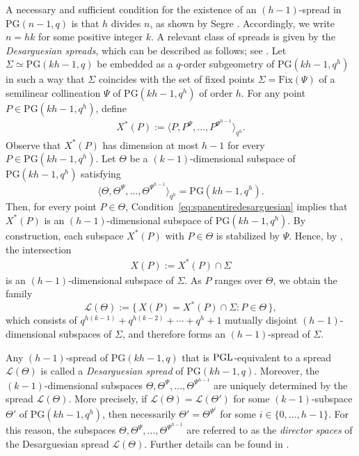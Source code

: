 \documentclass[11pt]{article}
\theoremstyle{definition}
\numberwithin{equation}{section}
\def\cL{\mathcal L}
\def\PG{\mathrm{PG}}
\def\PGL{{\rm PGL}}
\newcommand{\Fix}{\mathrm{Fix}}
\begin{document}
A necessary and sufficient condition for the existence of an $(h-1)$-spread
in $\PG(n-1,q)$ is that $h$ divides $n$, as shown by Segre \cite{segre1964teoria}.
Accordingly, we write $n=hk$ for some positive integer $k$.
A relevant class of spreads is given by the \emph{Desarguesian spreads},  which can
be described as follows; see \cite{segre1964teoria}. Let $\Sigma \simeq \PG(kh-1,q)$ be embedded as a $q$-order subgeometry of
$\PG(kh-1,q^h)$ in such a way that $\Sigma$ coincides with
the set of fixed points
$
\Sigma = \Fix(\Psi)
$
of a semilinear collineation $\Psi$ of $\PG(kh-1, q^h)$ of order $h$.
For any point $P \in \PG(kh-1, q^h)$, define
\begin{align*}
X^*(P) := \langle P, P^{\Psi}, \ldots, P^{\Psi^{h-1}} \rangle_{q^h}.    
\end{align*}
Observe that $X^*(P)$ has dimension at most $h-1$ for every $P \in \PG(kh-1, q^h)$. Let $\Theta$ be a $(k-1)$-dimensional subspace of $\PG(kh-1, q^h)$ satisfying
\begin{equation}\label{eq:spanentiredesarguesian}
\langle \Theta, \Theta^{\Psi}, \ldots, \Theta^{\Psi^{h-1}} \rangle_{q^h}
= \PG(kh-1, q^h).
\end{equation}
Then, for every point $P \in \Theta$, Condition~\eqref{eq:spanentiredesarguesian}
implies that $X^*(P)$ is an $(h-1)$-dimensional subspace of $\PG(kh-1, q^h)$. By construction, each subspace $X^*(P)$ with $P \in \Theta$ is stabilized by
$\Psi$. Hence, by \cite[Lemma~1]{lunardon1999normal}, the intersection
\begin{align*}
X(P) := X^*(P) \cap \Sigma  
\end{align*}
is an $(h-1)$-dimensional subspace of $\Sigma$.
As $P$ ranges over $\Theta$, we obtain the family
\[
\cL(\Theta)
:= \{\, X(P) = X^*(P) \cap \Sigma : P \in \Theta \,\},
\]
which consists of $q^{h(k-1)} + q^{h(k-2)} + \cdots + q^h + 1$ mutually
disjoint $(h-1)$-dimensional subspaces of $\Sigma$, and therefore forms an
$(h-1)$-spread of $\Sigma$.

Any $(h-1)$-spread of $\PG(kh-1,q)$ that is $\PGL$-equivalent to a spread  $\cL(\Theta)$ is called a \emph{Desarguesian spread} of
$\PG(kh-1,q)$.
Moreover, the $(k-1)$-dimensional subspaces
$
\Theta, \Theta^{\Psi}, \ldots, \Theta^{\Psi^{h-1}}
$
are uniquely determined by the spread $\cL(\Theta)$.
More precisely, if $\cL(\Theta) = \cL(\Theta')$ for some
$(k-1)$-subspace $\Theta'$ of $\PG(kh-1, q^h)$, then necessarily
$\Theta' = \Theta^{\Psi^i}$ for some $i \in \{0,\ldots,h-1\}$.
For this reason, the subspaces
$\Theta, \Theta^{\Psi}, \ldots, \Theta^{\Psi^{h-1}}$
are referred to as the \emph{director spaces} of the Desarguesian spread
$\cL(\Theta)$.
Further details can be found in
\cite{bader2011desarguesian, lunardon1999normal, segre1964teoria, VdV}.
\end{document}
